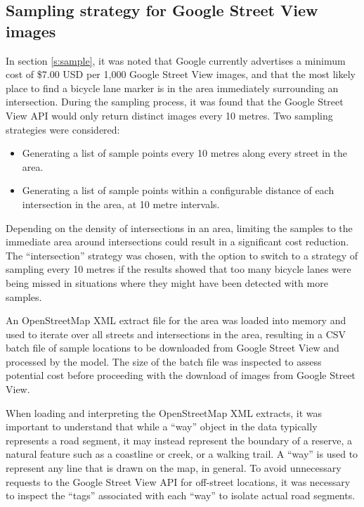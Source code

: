 \documentclass[11pt,twoside]{report}
\begin{document}
\subsection{Sampling strategy for Google Street View images}
\label{s:rq2a}

In section \ref{s:sample}, it was noted that Google currently advertises a minimum cost of \$7.00 USD per 1,000 Google Street View images, and that the most likely place to find a bicycle lane marker is in the area immediately surrounding an intersection.  During the sampling process, it was found that the Google Street View API would only return distinct images every 10 metres.  Two sampling strategies were considered:
\begin{itemize}
\item{Generating a list of sample points every 10 metres along every street in the area.}
\item{Generating a list of sample points within a configurable distance of each intersection in the area, at 10 metre intervals.	}
\end{itemize}

Depending on the density of intersections in an area, limiting the samples to the immediate area around intersections could result in a significant cost reduction.  The ``intersection'' strategy was chosen, with the option to switch to a strategy of sampling every 10 metres if the results showed that too many bicycle lanes were being missed in situations where they might have been detected with more samples.

An OpenStreetMap XML extract file for the area was loaded into memory and used to iterate over all streets and intersections in the area, resulting in a CSV batch file of sample locations to be downloaded from Google Street View and processed by the model.  The size of the batch file was inspected to assess potential cost before proceeding with the download of images from Google Street View.

When loading and interpreting the OpenStreetMap XML extracts, it was important to understand that while a ``way'' object in the data typically represents a road segment, it may instead represent the boundary of a reserve, a natural feature such as a coastline or creek, or a walking trail.  A ``way'' is used to represent any line that is drawn on the map, in general.  To avoid unnecessary requests to the Google Street View API for off-street locations, it was necessary to inspect the ``tags'' associated with each ``way'' to isolate actual road segments.
\end{document}
